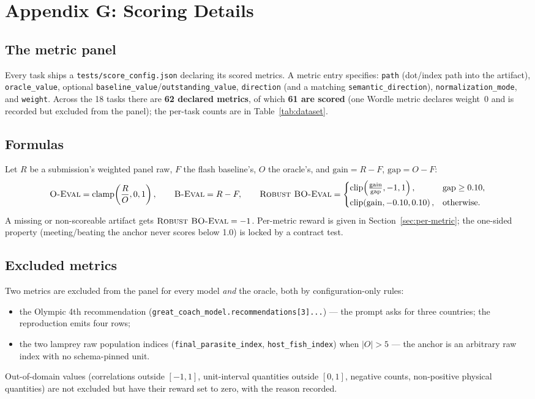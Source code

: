 \section{Appendix G: Scoring Details}
\label{app:scoring}

\subsection{The metric panel}
Every task ships a \texttt{tests/score\_config.json} declaring its scored metrics.
A metric entry specifies: \texttt{path} (dot/index path into the artifact),
\texttt{oracle\_value}, optional \texttt{baseline\_value}/\texttt{outstanding\_value},
\texttt{direction} (and a matching \texttt{semantic\_direction}),
\texttt{normalization\_mode}, and \texttt{weight}. Across the 18 tasks there are
\textbf{62 declared metrics}, of which \textbf{61 are scored} (one Wordle metric declares weight~0 and is recorded but excluded from the panel); the per-task counts are in Table~\ref{tab:dataset}.

\subsection{Formulas}
Let $R$ be a submission's weighted panel raw, $F$ the flash baseline's, $O$ the
oracle's, and $\mathrm{gain}=R-F$, $\mathrm{gap}=O-F$:
\[
\textsc{O-Eval} = \mathrm{clamp}\!\left(\frac{R}{O},0,1\right), \qquad
\textsc{B-Eval} = R - F, \qquad
\textsc{Robust BO-Eval} =
\begin{cases}
\mathrm{clip}\!\left(\frac{\mathrm{gain}}{\mathrm{gap}},-1,1\right), & \mathrm{gap}\ge0.10,\\[3pt]
\mathrm{clip}\!\left(\mathrm{gain},-0.10,0.10\right), & \text{otherwise}.
\end{cases}
\]
A missing or non-scoreable artifact gets $\textsc{Robust BO-Eval}=-1$. Per-metric reward is given
in Section~\ref{sec:per-metric}; the one-sided property (meeting/beating the
anchor never scores below 1.0) is locked by a contract test.

\subsection{Excluded metrics}
Two metrics are excluded from the panel for every model \emph{and} the oracle,
both by configuration-only rules:
\begin{itemize}[leftmargin=1.4em,itemsep=1pt]
\item the Olympic 4th recommendation
(\texttt{great\_coach\_model.recommendations[3]...}) --- the prompt asks for three
countries; the reproduction emits four rows;
\item the two lamprey raw population indices
(\texttt{final\_parasite\_index}, \texttt{host\_fish\_index}) when
$|O|>5$ --- the anchor is an arbitrary raw index with no schema-pinned unit.
\end{itemize}
Out-of-domain values (correlations outside $[-1,1]$, unit-interval quantities
outside $[0,1]$, negative counts, non-positive physical quantities) are not
excluded but have their reward set to zero, with the reason recorded.

